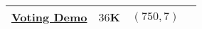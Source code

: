 \begin{customArrayStretch}{1.3}
\begin{longtable}{
    |p{4cm}| %
    >{\hfill}p{2.1cm}| %
    >{\hfill}p{2.5cm}| %
    p{2cm}| %
}
\href{http://www.nth-iteration.com/wp-content/uploads/2018/08/voting_demo.csv}{Voting Demo} \label{Datasets/nth-iteration/voting_demo} & 
$36$K &
$(750, 7)$ & 
\cite{statistics/book/Statistics-for-Data-Scientists/Maurits-Kaptein} \\ \hline










\end{longtable}
\end{customArrayStretch}


